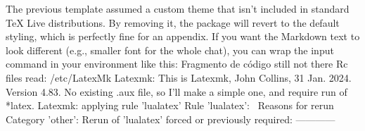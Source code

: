 {}\markdownRendererSectionBegin
{}\markdownRendererInterblockSeparator
{}The previous template assumed a custom theme that isn't included in standard TeX Live distributions. By removing it, the package will revert to the default styling, which is perfectly fine for an appendix.\markdownRendererInterblockSeparator
{}
\markdownRendererSectionEnd \markdownRendererSectionBegin
{}\markdownRendererInterblockSeparator
{}If you want the Markdown text to look different (e.g., smaller font for the whole chat), you can wrap the input command in your  environment like this:\markdownRendererInterblockSeparator
{}Fragmento de código\markdownRendererInterblockSeparator
{}\markdownRendererInterblockSeparator
{}\markdownRendererThematicBreak{}\markdownRendererInterblockSeparator
{}
\markdownRendererSectionEnd 
\markdownRendererSectionEnd \markdownRendererSectionBegin
{}\markdownRendererInterblockSeparator
{}still not there Rc files read: /etc/LatexMk Latexmk: This is Latexmk, John Collins, 31 Jan. 2024. Version 4.83. No existing .aux file, so I'll make a simple one, and require run of *latex. Latexmk: applying rule 'lualatex'\markdownRendererEllipsis{} Rule 'lualatex':  Reasons for rerun Category 'other': Rerun of 'lualatex' forced or previously required:\markdownRendererInterblockSeparator
{}
\markdownRendererSectionEnd \markdownRendererSectionBegin
{}\markdownRendererInterblockSeparator
{}
\markdownRendererSectionEnd \markdownRendererSectionBegin
{}\markdownRendererInterblockSeparator
{}------------\markdownRendererInterblockSeparator
{}
\markdownRendererSectionEnd \markdownRendererSectionBegin
{}\markdownRendererInterblockSeparator
